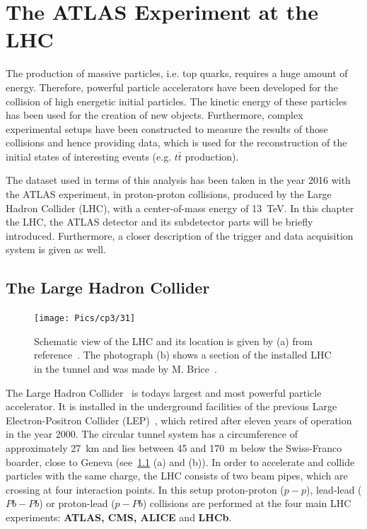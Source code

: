 \chapter{The ATLAS Experiment at the LHC}\label{ch3}

The production of massive particles, i.e. top quarks, requires a huge amount of energy. 
Therefore, powerful particle accelerators have been developed for the collision of high energetic initial particles. The kinetic energy of these particles has been used for the creation of new objects. Furthermore, complex experimental setups have been constructed to measure the results of those collisions and hence providing data, which is used for the reconstruction of the initial states of interesting events (e.g. $t\bar{t}$ production).

 The dataset used in terms of this analysis has been taken in the year 2016 with the ATLAS experiment, in proton-proton collisions, produced by the Large Hadron Collider (LHC), with a center-of-mass energy of 13~TeV. In this chapter the LHC, the ATLAS detector and its subdetector parts will be briefly introduced. Furthermore, a closer description of the trigger and data acquisition system is given as well. 




\section{The Large Hadron Collider}\label{LHC}
\vspace{0.5cm}
\begin{figure}[h]
\centering
\texttt{[image: Pics/cp3/31]}
\caption{Schematic view of the LHC and its location is given by (a) from reference~\cite{Bruning:2012zz}. The photograph (b) shows a section of the installed LHC in the  tunnel and was made by M. Brice~\cite{Brice:2221112}. }
\label{fig:31}
\end{figure}

 The Large Hadron Collider~\cite{Bruning:2012zz,Bruning:2004ej,Evans:2008zzb} is todays largest and most powerful particle accelerator. It is installed in the underground facilities of the previous Large Electron-Positron Collider (LEP)~\cite{LEP}, which retired after eleven years of operation in the year 2000. The circular tunnel system has a circumference of approximately 27~km and lies between 45 and 170~m below the Swiss-Franco boarder, close to Geneva (see~\cref{fig:31} (a) and (b)). In order to accelerate and collide particles with the same charge, the LHC consists of two beam pipes, which are crossing at four interaction points. In this setup proton-proton ($p-p$), lead-lead ($Pb-Pb$) or proton-lead ($p-Pb$) collisions are performed at the four main LHC experiments: \textbf{ATLAS, CMS, ALICE} and \textbf{LHCb}.

